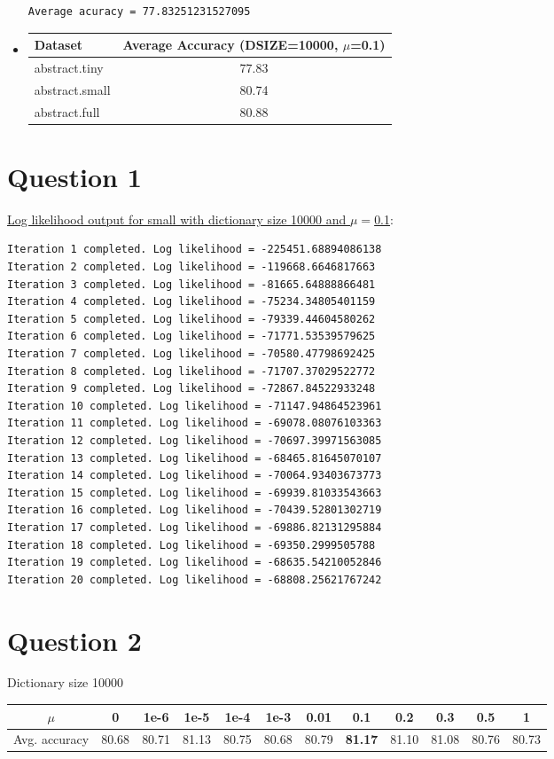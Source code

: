 \documentclass[paper=a4, fontsize=11pt]{scrartcl} %
\numberwithin{equation}{section} %
\numberwithin{figure}{section} %
\numberwithin{table}{section} %
\begin{document}
\begin{itemize}
\begin{verbatim}
Average acuracy = 77.83251231527095
\end{verbatim}

\item
\begin{tabular}{|l | c|}
\hline
\textbf{Dataset} & \textbf{Average Accuracy (DSIZE=10000, $\mu$=0.1)} \\
\hline
abstract.tiny & 77.83 \\
abstract.small & 80.74 \\
abstract.full & 80.88 \\

\hline
\end{tabular}
\end{itemize}

\section*{\textbf{Question 1}}
\underline{Log likelihood output for small with dictionary size 10000 and $\mu=$0.1}:
\begin{verbatim}
Iteration 1 completed. Log likelihood = -225451.68894086138
Iteration 2 completed. Log likelihood = -119668.6646817663
Iteration 3 completed. Log likelihood = -81665.64888866481
Iteration 4 completed. Log likelihood = -75234.34805401159
Iteration 5 completed. Log likelihood = -79339.44604580262
Iteration 6 completed. Log likelihood = -71771.53539579625
Iteration 7 completed. Log likelihood = -70580.47798692425
Iteration 8 completed. Log likelihood = -71707.37029522772
Iteration 9 completed. Log likelihood = -72867.84522933248
Iteration 10 completed. Log likelihood = -71147.94864523961
Iteration 11 completed. Log likelihood = -69078.08076103363
Iteration 12 completed. Log likelihood = -70697.39971563085
Iteration 13 completed. Log likelihood = -68465.81645070107
Iteration 14 completed. Log likelihood = -70064.93403673773
Iteration 15 completed. Log likelihood = -69939.81033543663
Iteration 16 completed. Log likelihood = -70439.52801302719
Iteration 17 completed. Log likelihood = -69886.82131295884
Iteration 18 completed. Log likelihood = -69350.2999505788
Iteration 19 completed. Log likelihood = -68635.54210052846
Iteration 20 completed. Log likelihood = -68808.25621767242
\end{verbatim}

\section*{\textbf{Question 2}}
Dictionary size 10000 \\
\begin{tabular}{ | c |c | c | c | c | c | c | c | c | c | c | c |}
\hline
$\mu$ & 0 & 1e-6 & 1e-5 & 1e-4 & 1e-3 & 0.01 & 0.1 & 0.2 & 0.3 & 0.5 & 1 \\
\hline
Avg. accuracy & 80.68 & 80.71 & 81.13 & 80.75 & 80.68 & 80.79 & \textbf{81.17} & 81.10 & 81.08 & 80.76 & 80.73 \\
\hline
\end{tabular}
\end{document}
